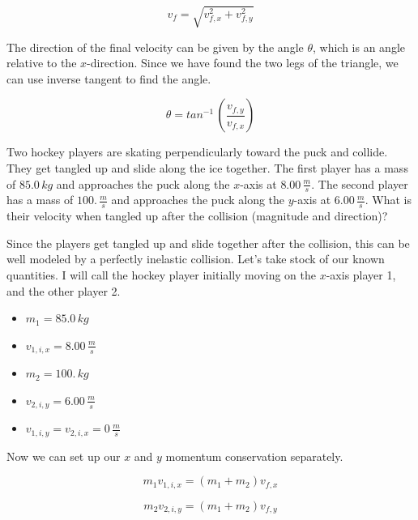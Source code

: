 \documentclass[12pt]{book}
\begin{document}
\begin{equation}
v_f = \sqrt{v_{f,x}^2 + v_{f,y}^2}
\end{equation}

The direction of the final velocity can be given by the angle $\theta$, which is an angle relative to the $x$-direction. Since we have found the two legs of the triangle, we can use inverse tangent to find the angle.

\begin{equation}
\theta = tan^{-1} \, \left( \frac{v_{f,y}}{v_{f,x}} \right)
\end{equation}

\begin{exampleblock}

Two hockey players are skating perpendicularly toward the puck and collide. They get tangled up and slide along the ice together. The first player has a mass of $85.0 \, kg$ and approaches the puck along the $x$-axis at $8.00 \, \frac{m}{s}$. The second player has a mass of $100. \, \frac{m}{s}$ and approaches the puck along the $y$-axis at $6.00 \, \frac{m}{s}$. What is their velocity when tangled up after the collision (magnitude and direction)?

\hspace{10pt}

Since the players get tangled up and slide together after the collision, this can be well modeled by a perfectly inelastic collision. Let's take stock of our known quantities. I will call the hockey player initially moving on the $x$-axis player 1, and the other player 2.

\begin{itemize}
\item $m_1 = 85.0 \, kg$
\item $v_{1,i,x} = 8.00 \, \frac{m}{s}$
\item $m_2 = 100. \, kg$
\item $v_{2,i,y} = 6.00 \, \frac{m}{s}$
\item $v_{1,i,y} = v_{2,i,x} = 0 \, \frac{m}{s}$
\end{itemize}

Now we can set up our $x$ and $y$ momentum conservation separately.

\begin{equation}
m_1 v_{1,i,x} = (m_1 + m_2) v_{f,x}
\end{equation}

\begin{equation}
m_2 v_{2,i,y} = (m_1 + m_2) v_{f,y}
\end{equation}


\end{exampleblock}
\end{document}
